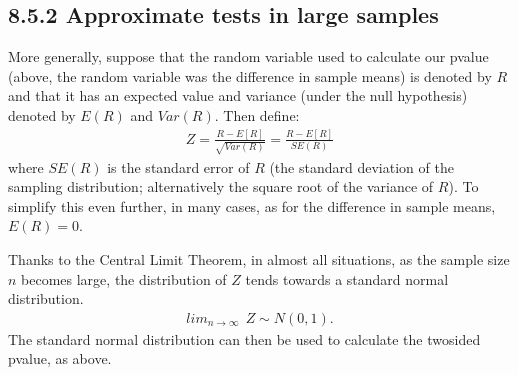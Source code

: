 \documentclass[letterpaper,10pt,english]{jupyterBook}
\begin{document}
\subsection{8.5.2 Approximate tests in large samples}
\label{\detokenize{08.f. Frequentist II:approximate-tests-in-large-samples}}
\sphinxAtStartPar
More generally, suppose that the random variable used to calculate our p\sphinxhyphen{}value (above, the random variable was the  difference in sample means) is denoted by \(R\) and that it has an expected value and variance (under the null hypothesis) denoted by \(E(R)\) and \(Var(R)\). Then define:
\begin{equation*}
\begin{split}
Z = \frac{R - E[R]}{\sqrt{Var(R)}} = \frac{R - E[R]}{SE(R)} 
\end{split}
\end{equation*}
\sphinxAtStartPar
where \(SE(R)\) is the standard error of \(R\) (the standard deviation of the sampling distribution; alternatively the square root of the variance of \(R\)). To simplify this even further, in many cases, as for the difference in sample means, \(E(R) = 0\).

\sphinxAtStartPar
Thanks to the Central Limit Theorem, in almost all situations, as the sample size \(n\) becomes large, the distribution of \(Z\) tends towards a standard normal distribution.
\begin{equation*}
\begin{split}
lim_{n\rightarrow \infty} \ \  Z \sim N(0, 1). 
\end{split}
\end{equation*}
\sphinxAtStartPar
The standard normal distribution can then be used to calculate the two\sphinxhyphen{}sided p\sphinxhyphen{}value, as above.
\end{document}
